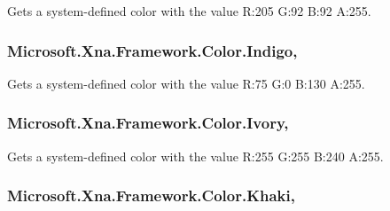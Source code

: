 Gets a system-\/defined color with the value R\+:205 G\+:92 B\+:92 A\+:255.

\hypertarget{struct_microsoft_1_1_xna_1_1_framework_1_1_color_a01840fe449cce8541464218c773fae16}{}
\subsubsection[{Indigo}]{ Microsoft.\+Xna.\+Framework.\+Color.\+Indigo\hspace{0.3cm}{\ttfamily [static]}, {\ttfamily [get]}}\label{struct_microsoft_1_1_xna_1_1_framework_1_1_color_a01840fe449cce8541464218c773fae16}


Gets a system-\/defined color with the value R\+:75 G\+:0 B\+:130 A\+:255.

\hypertarget{struct_microsoft_1_1_xna_1_1_framework_1_1_color_aac9b5ec33986b8d13f4b32926d23b25b}{}
\subsubsection[{Ivory}]{ Microsoft.\+Xna.\+Framework.\+Color.\+Ivory\hspace{0.3cm}{\ttfamily [static]}, {\ttfamily [get]}}\label{struct_microsoft_1_1_xna_1_1_framework_1_1_color_aac9b5ec33986b8d13f4b32926d23b25b}


Gets a system-\/defined color with the value R\+:255 G\+:255 B\+:240 A\+:255.

\hypertarget{struct_microsoft_1_1_xna_1_1_framework_1_1_color_a042a1656e4aab1deed27ad03e3e7e1af}{}
\subsubsection[{Khaki}]{ Microsoft.\+Xna.\+Framework.\+Color.\+Khaki\hspace{0.3cm}{\ttfamily [static]}, {\ttfamily [get]}}\label{struct_microsoft_1_1_xna_1_1_framework_1_1_color_a042a1656e4aab1deed27ad03e3e7e1af}


